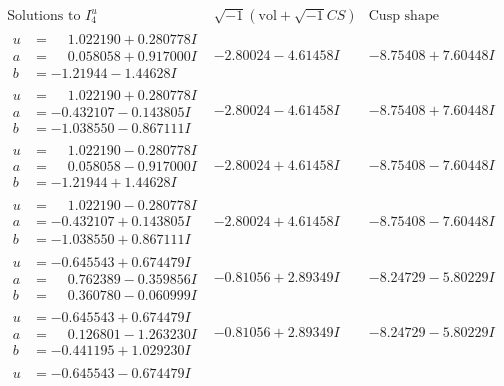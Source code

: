 \documentclass[1p]{elsarticle_modified}
\theoremstyle{definition}
\newcommand{\I}{\sqrt{-1}}
\begin{document}
$$\begin{array}{c|c|c}  
\text{Solutions to }I^u_{4}& \I (\text{vol} + \sqrt{-1}CS) & \text{Cusp shape}\\
 \hline 
\begin{aligned}
u &= \phantom{-}1.022190 + 0.280778 I \\
a &= \phantom{-}0.058058 + 0.917000 I \\
b &= -1.21944 - 1.44628 I\end{aligned}
 & -2.80024 - 4.61458 I & -8.75408 + 7.60448 I \\ \hline\begin{aligned}
u &= \phantom{-}1.022190 + 0.280778 I \\
a &= -0.432107 - 0.143805 I \\
b &= -1.038550 - 0.867111 I\end{aligned}
 & -2.80024 - 4.61458 I & -8.75408 + 7.60448 I \\ \hline\begin{aligned}
u &= \phantom{-}1.022190 - 0.280778 I \\
a &= \phantom{-}0.058058 - 0.917000 I \\
b &= -1.21944 + 1.44628 I\end{aligned}
 & -2.80024 + 4.61458 I & -8.75408 - 7.60448 I \\ \hline\begin{aligned}
u &= \phantom{-}1.022190 - 0.280778 I \\
a &= -0.432107 + 0.143805 I \\
b &= -1.038550 + 0.867111 I\end{aligned}
 & -2.80024 + 4.61458 I & -8.75408 - 7.60448 I \\ \hline\begin{aligned}
u &= -0.645543 + 0.674479 I \\
a &= \phantom{-}0.762389 - 0.359856 I \\
b &= \phantom{-}0.360780 - 0.060999 I\end{aligned}
 & -0.81056 + 2.89349 I & -8.24729 - 5.80229 I \\ \hline\begin{aligned}
u &= -0.645543 + 0.674479 I \\
a &= \phantom{-}0.126801 - 1.263230 I \\
b &= -0.441195 + 1.029230 I\end{aligned}
 & -0.81056 + 2.89349 I & -8.24729 - 5.80229 I \\ \hline\begin{aligned}
u &= -0.645543 - 0.674479 I \\

\end{aligned}
\end{array}$$
\end{document}
